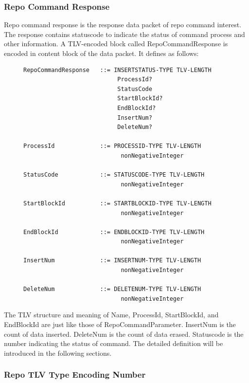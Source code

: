 \documentclass{acm_proc_article-sp}
\begin{document}
\subsubsection{Repo Command Response}
Repo command response is the response data packet of repo command interest. The response contains statuscode to indicate the status of command process and other information. A TLV-encoded block called RepoCommandResponse is encoded in content block of the data packet. It defines as follows:

\begin{figure}
\begin{framed}
\begin{BVerbatim}
RepoCommandResponse   ::= INSERTSTATUS-TYPE TLV-LENGTH
                           ProcessId?
                           StatusCode
                           StartBlockId?
                           EndBlockId?
                           InsertNum?
                           DeleteNum?

ProcessId             ::= PROCESSID-TYPE TLV-LENGTH
                            nonNegativeInteger

StatusCode            ::= STATUSCODE-TYPE TLV-LENGTH
                            nonNegativeInteger

StartBlockId          ::= STARTBLOCKID-TYPE TLV-LENGTH
                            nonNegativeInteger

EndBlockId            ::= ENDBLOCKID-TYPE TLV-LENGTH
                            nonNegativeInteger

InsertNum             ::= INSERTNUM-TYPE TLV-LENGTH
                            nonNegativeInteger

DeleteNum             ::= DELETENUM-TYPE TLV-LENGTH
                            nonNegativeInteger

\end{BVerbatim}
\end{framed}
\end{figure}

The TLV structure and meaning of Name, ProcessId, StartBlockId, and EndBlockId are just like those of RepoCommandParameter. InsertNum is the count of data inserted. DeleteNum is the count of data erased. Statuscode is the number indicating the status of command. The detailed definition will be introduced in the following sections.

\subsubsection{Repo TLV Type Encoding Number}
\end{document}
